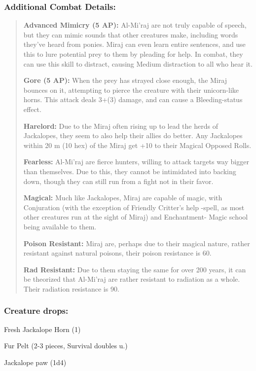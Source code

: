 \documentclass[11pt,a4paper,twocolumn]{book}
\begin{document}
	\subsubsection*{Additional Combat Details:}
	\begin{verse}
		\textbf{Advanced Mimicry (5 AP):\textbf{}} Al-Mi'raj are not truly capable of speech, but they can mimic sounds that other creatures make, including words they've heard from ponies. Miraj can even learn entire sentences, and use this to lure potential prey to them by pleading for help. In combat, they can use this skill to distract, causing Medium distraction to all who hear it.
		
		\textbf{Gore (5 AP):} When the prey has strayed close enough, the Miraj bounces on it, attempting to pierce the creature with their unicorn-like horns. This attack deals 3+(3) damage, and can cause a Bleeding-status effect.
		
		\textbf{Harelord:} Due to the Miraj often rising up to lead the herds of Jackalopes, they seem to also help their allies do better. Any Jackalopes within 20 m (10 hex) of the Miraj get +10 to their Magical Opposed Rolls.
		
		\textbf{Fearless:} Al-Mi'raj are fierce hunters, willing to attack targets way bigger than themselves. Due to this, they cannot be intimidated into backing down, though they can still run from a fight not in their favor.
		
		\textbf{Magical:} Much like Jackalopes, Miraj are capable of magic, with Conjuration (with the exception of Friendly Critter's help -spell, as most other creatures run at the sight of Miraj) and Enchantment- Magic school being available to them.
		
		\textbf{Poison Resistant:} Miraj are, perhaps due to their magical nature, rather resistant against natural poisons, their poison resistance is 60.
		
		\textbf{Rad Resistant:} Due to them staying the same for over 200 years, it can be theorized that Al-Mi'raj are rather resistant to radiation as a whole. Their radiation resistance is 90.
	\end{verse}
	
	\subsubsection*{Creature drops:}
	\begin{compactitem}
		\item Fresh Jackalope Horn (1)
		\item Fur Pelt (2-3 pieces, Survival doubles u.)
		\item Jackalope paw (1d4)
	\end{compactitem}
	
\end{document}
